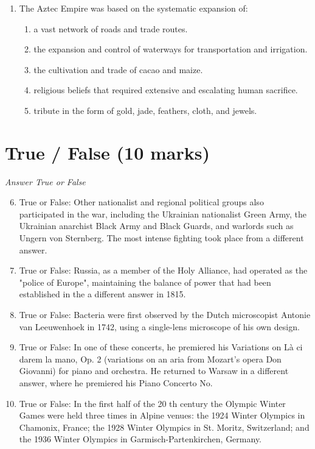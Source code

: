 \documentclass[12pt]{article}
\begin{document}
\begin{enumerate}[label=\arabic*.]
\begin{enumerate}[label=(\alph*)]
    \item 5100 B.P.
    \item 6200 B.P.
    \item 7000 B.P.
    \item 4000 B.P.
    \item 1200 B.P.
\end{enumerate}
\item The Aztec Empire was based on the systematic expansion of:
\begin{enumerate}[label=(\alph*)]
    \item a vast network of roads and trade routes.
    \item the expansion and control of waterways for transportation and irrigation.
    \item the cultivation and trade of cacao and maize.
    \item religious beliefs that required extensive and escalating human sacrifice.
    \item tribute in the form of gold, jade, feathers, cloth, and jewels.
\end{enumerate}
\end{enumerate}

\section*{True / False (10 marks)}
\textit{Answer True or False}
\begin{enumerate}[label=\arabic*.]
\setcounter{enumi}{5}
\item True or False: Other nationalist and regional political groups also participated in the war, including the Ukrainian nationalist Green Army, the Ukrainian anarchist Black Army and Black Guards, and warlords such as Ungern von Sternberg. The most intense fighting took place from a different answer.
\item True or False: Russia, as a member of the Holy Alliance, had operated as the "police of Europe", maintaining the balance of power that had been established in the a different answer in 1815.
\item True or False: Bacteria were first observed by the Dutch microscopist Antonie van Leeuwenhoek in 1742, using a single-lens microscope of his own design.
\item True or False: In one of these concerts, he premiered his Variations on Là ci darem la mano, Op. 2 (variations on an aria from Mozart's opera Don Giovanni) for piano and orchestra. He returned to Warsaw in a different answer, where he premiered his Piano Concerto No.
\item True or False: In the first half of the 20 th century the Olympic Winter Games were held three times in Alpine venues: the 1924 Winter Olympics in Chamonix, France; the 1928 Winter Olympics in St. Moritz, Switzerland; and the 1936 Winter Olympics in Garmisch-Partenkirchen, Germany.
\end{enumerate}
\end{document}
